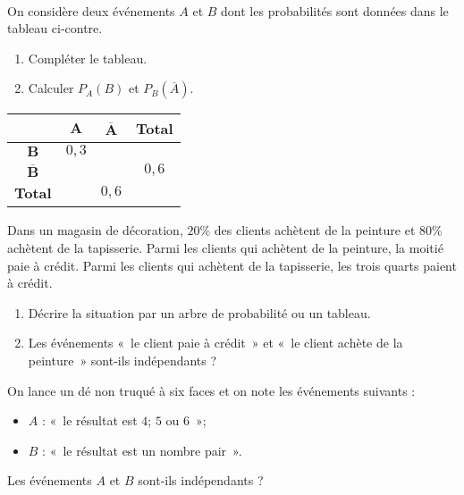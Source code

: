 \documentclass[11pt]{article}
\begin{document}
\begin{exo}~\\
  \begin{minipage}{.65\textwidth}
    On considère deux événements $A$ et $B$ dont les probabilités sont données
    dans le tableau ci-contre.
    \begin{enumerate}
      \item Compléter le tableau.
      \item Calculer $P_A(B)$ et $P_B(\overline A)$.
    \end{enumerate}
\end{minipage}
\begin{minipage}{.35\textwidth}
  \begin{center}
 \begin{tabular}{cccc}
  \toprule
  & $\mathbf{A}$ & $\mathbf{\overline A}$ & \textbf{Total} \\
  \midrule
  $\mathbf{B}$ & $0,3$ & & \\
  $\mathbf{\overline B}$ & & & $0,6$ \\
  \textbf{Total} & & $0,6$ & \\
  \bottomrule
\end{tabular}
  \end{center}
\end{minipage}
\end{exo}

\begin{exo}
  Dans un magasin de décoration, $20$\% des clients achètent de la peinture et
  $80$\% achètent de la tapisserie. Parmi les clients qui achètent de la
  peinture, la moitié paie à crédit. Parmi les clients qui achètent de la
  tapisserie, les trois quarts paient à crédit.
  \begin{enumerate}
    \item Décrire la situation par un arbre de probabilité ou un tableau.
    \item Les événements «~le client paie à crédit~» et «~le client achète de la
      peinture~» sont-ils indépendants ?
  \end{enumerate}
\end{exo}

\begin{exo}
On lance un dé non truqué à six faces et on note les événements
suivants : 
\begin{itemize}
  \item $A$ : «~le résultat est $4$; $5$ ou $6$~»;
  \item $B$ : «~le résultat est un nombre pair~».
\end{itemize}
Les événements $A$ et $B$ sont-ils indépendants ?
\end{exo}
\end{document}
